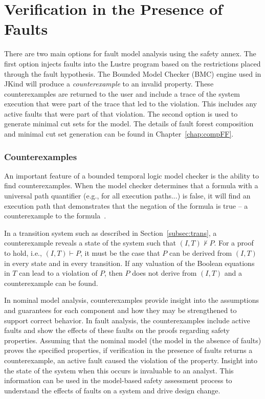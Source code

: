 \section{Verification in the Presence of Faults}
\label{sec:analysisResults}
There are two main options for fault model analysis using the safety annex. The first option injects faults into the Lustre program based on the restrictions placed through the fault hypothesis. The Bounded Model Checker (BMC) engine used in JKind will produce a {\em counterexample} to an invalid property. These counterexamples are returned to the user and include a trace of the system execution that were part of the trace that led to the violation. This includes any active faults that were part of that violation. The second option is used to generate minimal cut sets for the model. The details of fault forest composition and minimal cut set generation can be found in Chapter~\ref{chap:compFF}.

\subsubsection{Counterexamples}
An important feature of a bounded temporal logic model checker is the ability to find counterexamples. When the model checker determines that a formula with a universal path quantifier (e.g., for all execution paths...) is false, it will find an execution path that demonstrates that the negation of the formula is true -- a counterexample to the formula~\cite{clarke2018model}. 

In a transition system such as described in Section~\ref{subsec:trans}, a counterexample reveals a state of the system such that $(I, T) \nvdash P$. For a proof to hold, i.e., $(I, T) \vdash P$, it must be the case that $P$ can be derived from $(I,T)$ in every state and in every transition. If any valuation of the Boolean equations in $T$ can lead to a violation of $P$, then $P$ does not derive from $(I,T)$ and a counterexample can be found. 

In nominal model analysis, counterexamples provide insight into the assumptions and guarantees for each component and how they may be strengthened to support correct behavior. In fault analysis, the counterexamples include active faults and show the effects of these faults on the proofs regarding safety properties. Assuming that the nominal model (the model in the absence of faults) proves the specified properties, if verification in the presence of faults returns a counterexample, an active fault caused the violation of the property. Insight into the state of the system when this occurs is invaluable to an analyst. This information can be used in the model-based safety assessment process to understand the effects of faults on a system and drive design change. 

